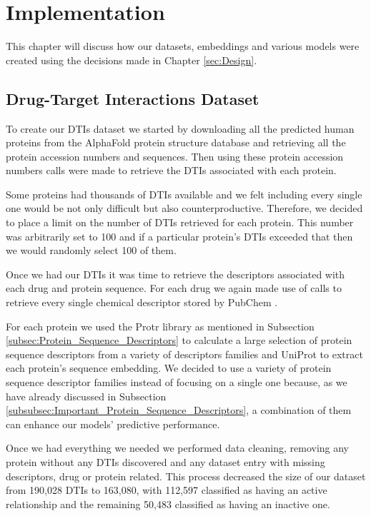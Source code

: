 \section{Implementation}

This chapter will discuss how our datasets, embeddings and various models were created using the decisions made in Chapter \ref{sec:Design}.

\subsection{Drug-Target Interactions Dataset}

To create our DTIs dataset we started by downloading all the predicted human proteins from the AlphaFold protein structure database \citep{Jumper2021, Varadi2022} and retrieving all the protein accession numbers and sequences. Then using these protein accession numbers \citet{PubChemAPI} calls were made to retrieve the DTIs associated with each protein.

Some proteins had thousands of DTIs available and we felt including every single one would be not only difficult but also counterproductive. Therefore, we decided to place a limit on the number of DTIs retrieved for each protein. This number was arbitrarily set to 100 and if a particular protein's DTIs exceeded that then we would randomly select 100 of them.

Once we had our DTIs it was time to retrieve the descriptors associated with each drug and protein sequence. For each drug we again made use of \citet{PubChemAPI} calls to retrieve every single chemical descriptor stored by PubChem \citep{PubChem}. 

For each protein we used the Protr \citep{ProtR_Paper} library as mentioned in Subsection \ref{subsec:Protein_Sequence_Descriptors} to calculate a large selection of protein sequence descriptors from a variety of descriptors families and UniProt \citep{UniProt_Paper} to extract each protein's sequence embedding. We decided to use a variety of protein sequence descriptor families instead of focusing on a single one because, as we have already discussed in Subsection \ref{subsubsec:Important_Protein_Sequence_Descriptors}, a combination of them can enhance our models' predictive performance.

Once we had everything we needed we performed data cleaning, removing any protein without any DTIs discovered and any dataset entry with missing descriptors, drug or protein related. This process decreased the size of our dataset from 190,028 DTIs to 163,080, with 112,597 classified as having an active relationship and the remaining 50,483 classified as having an inactive one. 


